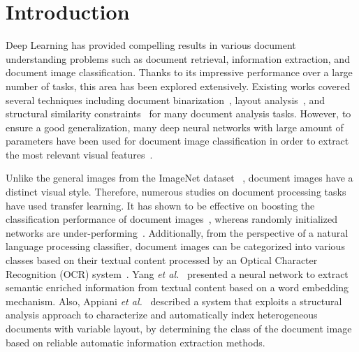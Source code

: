 \documentclass[twocolumn]{svjour3}
\newcommand{\etal}{\textit{et al.}}
\begin{document}
\section{Introduction}
\label{sec:intro}
Deep Learning has provided compelling results in various document understanding problems such as document  retrieval, information extraction, and document image classification. Thanks to its impressive performance over a large number of tasks, this area has been explored extensively. Existing works covered several techniques including document binarization~\cite{Afzal2015DocumentIB, PastorPellicer2015InsightsOT}, layout analysis~\cite{PastorPellicer2016CompleteSF, Seuret2017PCAInitializedDN}, and structural similarity constraints~\cite{Chen2006ASO} for many document analysis tasks. However, to ensure a good generalization, many deep neural networks with large amount of parameters have been used for document image classification in order to extract the most relevant visual features~\cite{LeCun1998GradientbasedLA}. 

Unlike the general images from the ImageNet dataset ~\cite{Russakovsky2015ImageNetLS}, document images have a distinct visual style. Therefore, numerous studies on document processing tasks have used transfer learning. It has shown to be effective on boosting the classification performance of document images~\cite{Harley2015EvaluationOD, Afzal2015DeepdocclassifierDC, 8545630}, whereas randomly initialized networks are under-performing~\cite{Kang2014ConvolutionalNN}. Additionally, from the perspective of a natural language processing classifier, document images can be categorized into various classes based on their textual content processed by an Optical Character Recognition (OCR) system~\cite{Qian2010ANA, UlHasan2015ASL}. Yang \etal~\cite{Yang2017LearningTE} presented a neural network to extract semantic enriched information from textual content based on a word embedding mechanism. Also, Appiani \etal ~\cite{Appiani2001AutomaticDC} described a system that exploits a structural analysis approach to characterize and automatically index heterogeneous documents with variable layout, by determining the class of the document image based on reliable automatic information extraction methods.
\end{document}
